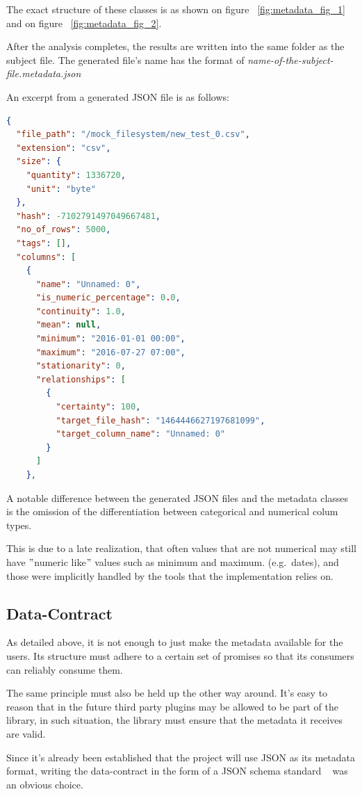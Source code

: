 The exact structure of these classes is as shown on figure ~\ref{fig:metadata_fig_1} and on figure ~\ref{fig:metadata_fig_2}.

After the analysis completes, the results are written into the same folder as the subject file.
The generated file's name has the format of \textit{name-of-the-subject-file.metadata.json}

\newline
\newline

An excerpt from a generated JSON file is as follows:
\begin{lstlisting}[language=json,firstnumber=1]
{
  "file_path": "/mock_filesystem/new_test_0.csv",
  "extension": "csv",
  "size": {
    "quantity": 1336720,
    "unit": "byte"
  },
  "hash": -7102791497049667481,
  "no_of_rows": 5000,
  "tags": [],
  "columns": [
    {
      "name": "Unnamed: 0",
      "is_numeric_percentage": 0.0,
      "continuity": 1.0,
      "mean": null,
      "minimum": "2016-01-01 00:00",
      "maximum": "2016-07-27 07:00",
      "stationarity": 0,
      "relationships": [
        {
          "certainty": 100,
          "target_file_hash": "1464446627197681099",
          "target_column_name": "Unnamed: 0"
        }
      ]
    },
\end{lstlisting}

A notable difference between the generated JSON files and the metadata classes is the
omission of the differentiation between categorical and numerical colum types.

This is due to a late realization, that often values that are not numerical may still have
\("\)numeric like\("\) values such as minimum and maximum. (e.g.\ dates), and those
were implicitly handled by the tools that the implementation relies on.

\subsection{Data-Contract}
As detailed above, it is not enough to just make the metadata available for the users.
Its structure must adhere to a certain set of promises so that its consumers can reliably consume them.

The same principle must also be held up the other way around.
It's easy to reason that in the future third party plugins may be allowed to be part of
the library, in such situation, the library must ensure that the metadata it receives are valid.

Since it's already been established that the project will use JSON as its metadata format,
writing the data-contract in the form of a JSON schema standard ~\cite{jsonschema} was an obvious choice.

